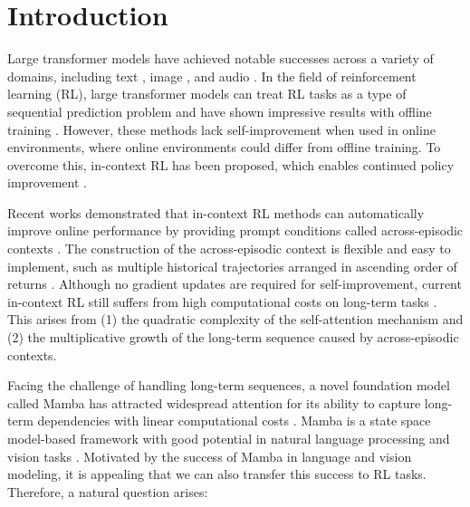 
\section{Introduction}
Large transformer models \cite{4} have achieved notable successes across a variety of domains, including text \cite{47}, image \cite{48}, and audio \cite{49}. 
In the field of reinforcement learning (RL), large transformer models can treat RL tasks as a type of sequential prediction problem and have shown impressive results with offline training \cite{14,27}. However, these methods lack self-improvement when used in online environments, where online environments could differ from offline training. To overcome this, in-context RL has been proposed, which enables continued policy improvement \cite{8}.

Recent works demonstrated that in-context RL methods can automatically improve online performance by providing prompt conditions called across-episodic contexts \cite{3}. The construction of the across-episodic context is flexible and easy to implement, such as multiple historical trajectories arranged in ascending order of returns \cite{1}. Although no gradient updates are required for self-improvement, current in-context RL still suffers from high computational costs on long-term tasks \cite{8}. This arises from (1) the quadratic complexity of the self-attention mechanism and (2) the multiplicative growth of the long-term sequence caused by across-episodic contexts.

Facing the challenge of handling long-term sequences, a novel foundation model called Mamba has attracted widespread attention for its ability to capture long-term dependencies with linear computational costs \cite{10}. Mamba is a state space model-based framework with good potential in natural language processing and vision tasks \cite{11}. Motivated by the success of Mamba in language and vision modeling, it is appealing that we can also transfer this success to RL tasks. Therefore, a natural question arises:

